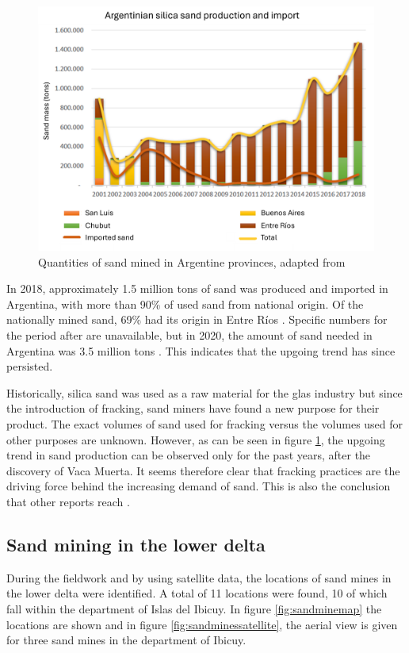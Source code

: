 \begin{figure}[H]
    \centering
    \includegraphics[width=1\linewidth]{figures/ch9/Sandgraphquantities.png}
    \caption{Quantities of sand mined in Argentine provinces, adapted from \cite{secretariadepoliticamineraArenasParaFracking2019}}
    \label{fig:sanddiagram}
\end{figure}

In 2018, approximately 1.5 million tons of sand was produced and imported in Argentina, with more than 90\% of used sand from national origin. Of the nationally mined sand, 69\% had its origin in Entre Ríos \autocite{secretariadepoliticamineraArenasParaFracking2019}. Specific numbers for the period after are unavailable, but in 2020, the amount of sand needed in Argentina was 3.5 million tons \autocite{novasImpactoAmbientalOculto2022}. This indicates that the upgoing trend has since persisted.

Historically, silica sand was used as a raw material for the glas industry but since the introduction of fracking, sand miners have found a new purpose for their product. The exact volumes of sand used for fracking versus the volumes used for other purposes are unknown. However, as can be seen in figure \ref{fig:sanddiagram}, the upgoing trend in sand production can be observed only for the past years, after the discovery of Vaca Muerta. It seems therefore clear that fracking practices are the driving force behind the increasing demand of sand. This is also the conclusion that other reports reach \autocite{secretariadepoliticamineraArenasParaFracking2019} \autocite{fogliaSedArena2023}.

\subsection{Sand mining in the lower delta}
During the fieldwork and by using satellite data, the locations of sand mines in the lower delta were identified. A total of 11 locations were found, 10 of which fall within the department of Islas del Ibicuy. In figure \ref{fig:sandminemap} the locations are shown and in figure \ref{fig:sandminessatellite}, the aerial view is given for three sand mines in the department of Ibicuy.

